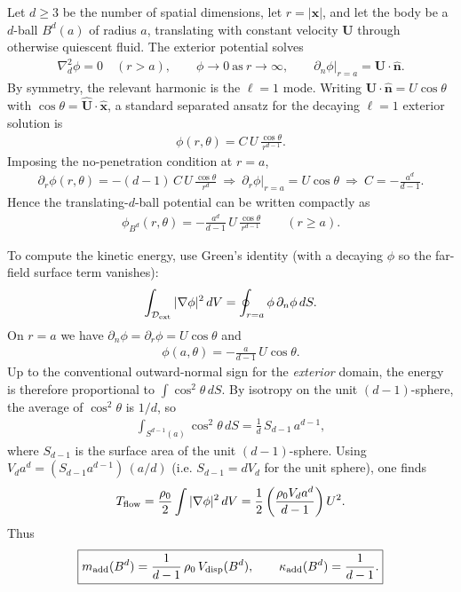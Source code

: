 \documentclass[11pt]{article}
\begin{document}
Let $d\ge 3$ be the number of spatial dimensions, let $r=|\mathbf x|$, and let the
body be a $d$-ball $B^d(a)$ of radius $a$, translating with constant velocity
$\mathbf U$ through otherwise quiescent fluid.  The exterior potential solves
\begin{align}
\nabla_d^2 \phi = 0 \quad (r>a),
\qquad
\phi\to 0\ \text{as}\ r\to\infty,
\qquad
\partial_n \phi \big|_{r=a} = \mathbf U\cdot \hat{\mathbf n}.
\end{align}
By symmetry, the relevant harmonic is the $\ell=1$ mode.  Writing
$\mathbf U\cdot \hat{\mathbf n} = U\cos\theta$ with $\cos\theta = \hat{\mathbf U}\cdot \hat{\mathbf x}$,
a standard separated ansatz for the decaying $\ell=1$ exterior solution is
\begin{align}
\phi(r,\theta) = C\,U\,\frac{\cos\theta}{r^{d-1}}.
\end{align}
Imposing the no-penetration condition at $r=a$,
\begin{align}
\partial_r \phi(r,\theta)
=
-(d-1)\,C\,U\,\frac{\cos\theta}{r^{d}}
\ \Longrightarrow\
\partial_r \phi\big|_{r=a} = U\cos\theta
\ \Longrightarrow\
C = -\frac{a^{d}}{d-1}.
\end{align}
Hence the translating-$d$-ball potential can be written compactly as
\begin{align}
\boxed{
\phi_{B^d}(r,\theta)
=
-\frac{a^{d}}{d-1}\,U\,\frac{\cos\theta}{r^{d-1}}
}
\qquad
(r\ge a).
\end{align}

To compute the kinetic energy, use Green’s identity (with a decaying $\phi$ so
the far-field surface term vanishes):
\begin{align}
\int_{\mathcal D_{\rm ext}} |\nabla \phi|^2\,dV
=
\oint_{r=a} \phi\,\partial_n \phi\,dS.
\end{align}
On $r=a$ we have $\partial_n\phi=\partial_r\phi=U\cos\theta$ and
\begin{align}
\phi(a,\theta) = -\frac{a}{d-1}\,U\cos\theta.
\end{align}
Up to the conventional outward-normal sign for the \emph{exterior} domain, the
energy is therefore proportional to $\int \cos^2\theta\,dS$.  By isotropy on the
unit $(d-1)$-sphere, the average of $\cos^2\theta$ is $1/d$, so
\begin{align}
\int_{S^{d-1}(a)} \cos^2\theta\,dS = \frac{1}{d}\,S_{d-1}\,a^{d-1},
\end{align}
where $S_{d-1}$ is the surface area of the unit $(d-1)$-sphere.  Using
$V_d a^d = (S_{d-1}a^{d-1})\,(a/d)$ (i.e. $S_{d-1}=dV_d$ for the unit sphere),
one finds
\begin{align}
T_{\rm flow}
=
\frac{\rho_0}{2}\int |\nabla\phi|^2\,dV
=
\frac{1}{2}\left(\frac{\rho_0 V_d a^d}{d-1}\right)U^2.
\end{align}
Thus
\begin{align}
\boxed{
m_{\rm add}(B^d)
=
\frac{1}{d-1}\,\rho_0\,V_{\rm disp}(B^d),
\qquad
\kappa_{\rm add}(B^d)=\frac{1}{d-1}.
}
\end{align}
\end{document}
